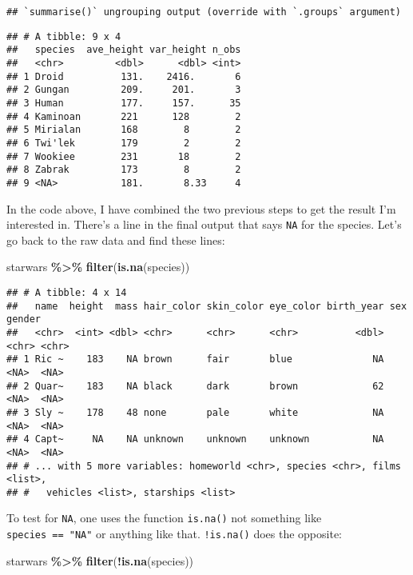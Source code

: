 \documentclass[
]{article}
\newenvironment{Shaded}{\begin{snugshade}}{\end{snugshade}}
\newcommand{\KeywordTok}[1]{\textcolor[rgb]{0.13,0.29,0.53}{\textbf{#1}}}
\newcommand{\NormalTok}[1]{#1}
\newcommand{\OperatorTok}[1]{\textcolor[rgb]{0.81,0.36,0.00}{\textbf{#1}}}
\newcommand{\StringTok}[1]{\textcolor[rgb]{0.31,0.60,0.02}{#1}}
\begin{document}
\begin{verbatim}
## `summarise()` ungrouping output (override with `.groups` argument)
\end{verbatim}

\begin{verbatim}
## # A tibble: 9 x 4
##   species  ave_height var_height n_obs
##   <chr>         <dbl>      <dbl> <int>
## 1 Droid          131.    2416.       6
## 2 Gungan         209.     201.       3
## 3 Human          177.     157.      35
## 4 Kaminoan       221      128        2
## 5 Mirialan       168        8        2
## 6 Twi'lek        179        2        2
## 7 Wookiee        231       18        2
## 8 Zabrak         173        8        2
## 9 <NA>           181.       8.33     4
\end{verbatim}

In the code above, I have combined the two previous steps to get the result I'm interested in. There's
a line in the final output that says \texttt{NA} for the species. Let's go back to the raw data and find
these lines:

\begin{Shaded}
\begin{Highlighting}[]
\NormalTok{starwars }\OperatorTok{\%\textgreater{}\%}
\StringTok{  }\KeywordTok{filter}\NormalTok{(}\KeywordTok{is.na}\NormalTok{(species))}
\end{Highlighting}
\end{Shaded}

\begin{verbatim}
## # A tibble: 4 x 14
##   name  height  mass hair_color skin_color eye_color birth_year sex   gender
##   <chr>  <int> <dbl> <chr>      <chr>      <chr>          <dbl> <chr> <chr> 
## 1 Ric ~    183    NA brown      fair       blue              NA <NA>  <NA>  
## 2 Quar~    183    NA black      dark       brown             62 <NA>  <NA>  
## 3 Sly ~    178    48 none       pale       white             NA <NA>  <NA>  
## 4 Capt~     NA    NA unknown    unknown    unknown           NA <NA>  <NA>  
## # ... with 5 more variables: homeworld <chr>, species <chr>, films <list>,
## #   vehicles <list>, starships <list>
\end{verbatim}

To test for \texttt{NA}, one uses the function \texttt{is.na()} not something like \texttt{species\ ==\ "NA"} or anything
like that. \texttt{!is.na()} does the opposite:

\begin{Shaded}
\begin{Highlighting}[]
\NormalTok{starwars }\OperatorTok{\%\textgreater{}\%}
\StringTok{  }\KeywordTok{filter}\NormalTok{(}\OperatorTok{!}\KeywordTok{is.na}\NormalTok{(species))}
\end{Highlighting}
\end{Shaded}
\end{document}
